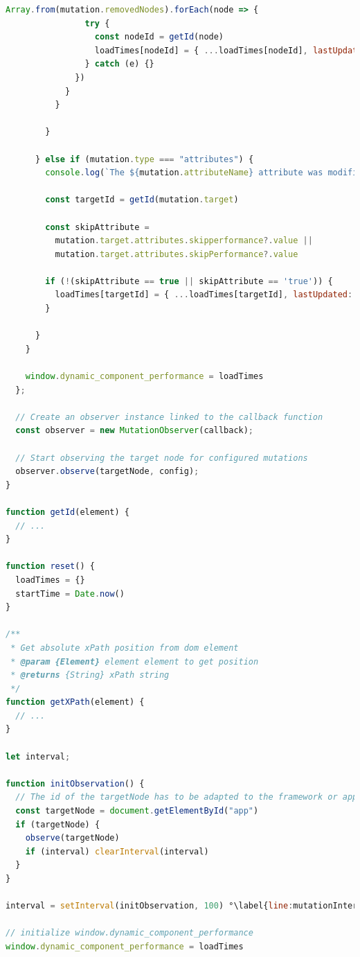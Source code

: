 \documentclass[a4paper, 10pt]{article}
\begin{document}
\begin{lstlisting}[caption={Injected mutation recorder script}, label={lst:performance-recorder}, language=JavaScript, escapechar=°]
              Array.from(mutation.removedNodes).forEach(node => {
                try {
                  const nodeId = getId(node)
                  loadTimes[nodeId] = { ...loadTimes[nodeId], lastUpdated: Date.now() - startTime, xpath: loadTimes[nodeId]?.xpath || getXPath(node) }
                } catch (e) {}
              })
            }
          }

        }

      } else if (mutation.type === "attributes") {
        console.log(`The ${mutation.attributeName} attribute was modified.`, mutation);

        const targetId = getId(mutation.target)

        const skipAttribute =
          mutation.target.attributes.skipperformance?.value ||
          mutation.target.attributes.skipPerformance?.value

        if (!(skipAttribute == true || skipAttribute == 'true')) {
          loadTimes[targetId] = { ...loadTimes[targetId], lastUpdated: Date.now() - startTime, xpath: loadTimes[targetId]?.xpath || getXPath(mutation.target) }
        }

      }
    }

    window.dynamic_component_performance = loadTimes
  };

  // Create an observer instance linked to the callback function
  const observer = new MutationObserver(callback);

  // Start observing the target node for configured mutations
  observer.observe(targetNode, config);
}

function getId(element) {
  // ...
}

function reset() {
  loadTimes = {}
  startTime = Date.now()
}

/**
 * Get absolute xPath position from dom element
 * @param {Element} element element to get position
 * @returns {String} xPath string
 */
function getXPath(element) {
  // ...
}

let interval;

function initObservation() {
  // The id of the targetNode has to be adapted to the framework or application
  const targetNode = document.getElementById("app")
  if (targetNode) {
    observe(targetNode)
    if (interval) clearInterval(interval)
  }
}

interval = setInterval(initObservation, 100) °\label{line:mutationInterval}°

// initialize window.dynamic_component_performance
window.dynamic_component_performance = loadTimes
\end{lstlisting}
\end{document}
